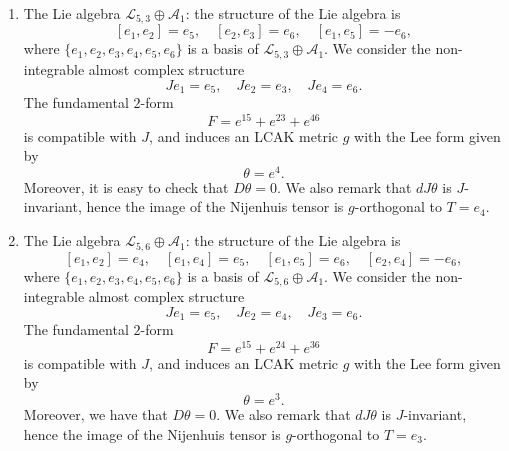 \documentclass[a4paper,11pt]{amsart}
\theoremstyle{definition}
\renewcommand{\[}{\begin{equation*}}
\renewcommand{\]}{\end{equation*}}
\begin{document}
\begin{enumerate}

\item{The Lie algebra $\mathcal{L}_{5,3}\oplus \mathcal{A}_1$}: the structure of the Lie algebra is 
$$[e_1,e_2]=e_5,\quad [e_2,e_3]=e_6,\quad [e_1,e_5]=-e_6,$$
where $\{e_1,e_2,e_3,e_4,e_5,e_6\}$ is a basis of $\mathcal{L}_{5,3}\oplus \mathcal{A}_1$.
We consider the non-integrable almost complex structure
$$Je_1=e_5,\quad Je_2=e_3,\quad Je_4=e_6.$$
The fundamental $2$-form
$$F=e^{15}+e^{23}+e^{46}$$
is compatible with $J$, and induces an LCAK metric $g$ with the Lee form given by
$$\theta=e^4.$$
Moreover, it is easy to check that $D\theta=0.$ We also remark that $dJ\theta$ is $J$-invariant, hence the image of the Nijenhuis tensor is $g$-orthogonal to $T=e_4$.\\


\item{The Lie algebra $\mathcal{L}_{5,6}\oplus \mathcal{A}_1$}: the structure of the Lie algebra is 
$$[e_1,e_2]=e_4,\quad [e_1,e_4]=e_5,\quad [e_1,e_5]=e_6,\quad [e_2,e_4]=-e_6,$$
where $\{e_1,e_2,e_3,e_4,e_5,e_6\}$ is a basis of $\mathcal{L}_{5,6}\oplus \mathcal{A}_1$.
We consider the non-integrable almost complex structure
$$Je_1=e_5,\quad Je_2=e_4,\quad Je_3=e_6.$$
The fundamental $2$-form
$$F=e^{15}+e^{24}+e^{36}$$
is compatible with $J$, and induces an LCAK metric $g$ with the Lee form given by
$$\theta=e^3.$$
Moreover, we have that $D\theta=0.$ We also remark that $dJ\theta$ is $J$-invariant, hence the image of the Nijenhuis tensor is $g$-orthogonal to $T=e_3$.\\


\end{enumerate}
\end{document}
